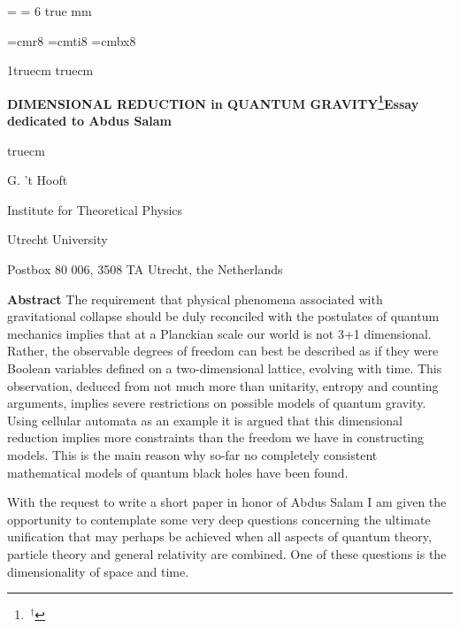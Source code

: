 


\magnification= 
\parskip=0pt
\baselineskip= 6 true mm
 
\font\smallrm=cmr8
\font\smallit=cmti8
\font\smallbf=cmbx8

\def\a{\alpha}
\def\b{\beta}
\def\g{\gamma} \def\G{\Gamma}
\def\d{\delta} \def\D{\Delta}
\def\e{\varepsilon}
\def\h{\eta}
\def\k{\kappa}
\def\l{\lambda} \def\L{\Lambda}
\def\m{\mu}
\def\f{\phi} \def\F{\Phi}
\def\n{\nu}
\def\j{\psi} \def\J{\Psi}
\def\r{\rho}
\def\s{\sigma} \def\S{\Sigma}
\def\t{\tau}
\def\th{\theta} \def\thh{\vartheta} \def\Th{\Theta}

\def\ch{\chi}
\def\w{\omega} \def\W{\Omega}
\def\v{\varphi}
\def\z{\zeta}

\def\slash{\llap /}
\def\Lagr{{\cal L}}
\def\pa{\partial}

\def\cl{\centerline}
\def\ts{\textstyle}
\def\x{{\bf x}}
\def\E{{\bf e}}
{\nopagenumbers

\vglue 1truecm    truecm


\cl {\bf DIMENSIONAL REDUCTION in QUANTUM
GRAVITY\footnote{$\,^\dagger$}{\smallrm Essay dedicated to Abdus Salam}}
 truecm
\cl {G. 't Hooft}
\cl {Institute for Theoretical Physics}
\cl {Utrecht University}
\cl {Postbox 80 006, 3508 TA Utrecht, the Netherlands}
\vfil
{\bf Abstract}
\medskip
The requirement that physical phenomena associated with gravitational
collapse should be duly reconciled with the postulates of quantum
mechanics implies that at a Planckian scale our world is not 3+1
dimensional. Rather, the observable degrees of freedom can best be
described as if they were Boolean variables defined on a
two-dimensional lattice, evolving with time. This observation, deduced
from not much more than unitarity, entropy and counting arguments,
implies severe restrictions on possible models of quantum gravity.
Using cellular automata as an example it is argued that this
dimensional reduction implies more constraints than the freedom we have
in constructing models. This is the main reason why so-far no
completely consistent mathematical models of quantum black holes have
been found.

\vfil\eject}
With the request to write a short paper in honor of Abdus Salam I am
given the opportunity to contemplate some very deep questions
concerning the ultimate unification that may perhaps be achieved when
all aspects of quantum theory, particle theory and general relativity
are combined. One of these questions is the dimensionality of space and
time.

